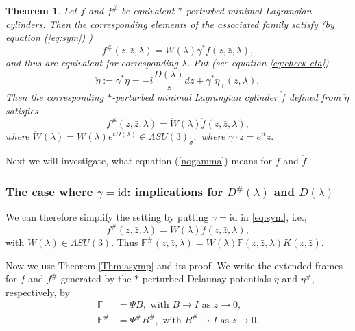 \documentclass[a4paper,11pt]{amsart}
\newtheorem{theorem}{Theorem}[section]
\theoremstyle{definition}
\numberwithin{equation}{section}
\begin{document}
\begin{theorem} \label{reduce to gamma = id}
Let $f$ and $f^{\#}$ be equivalent $*$-perturbed minimal Lagrangian cylinders. Then the corresponding elements
of the associated family satisfy  (by equation (\ref{eq:sym}) )
\begin{equation}
f^{\#}(z,\bar{z},\lambda)=W(\lambda) \gamma^*f( z, \bar{z}, \lambda),
\end{equation} 
and thus are equivalent for corresponding $\lambda$.
\newline Put  (see equation \eqref{eq:check-eta})
\begin{equation*}
\check{\eta}:=\gamma^*\eta=-i\frac{D(\lambda)}{z}dz+\gamma^*\eta_{+}(z,\lambda),
\end{equation*}
Then the corresponding  $*$-perturbed minimal Lagrangian cylinder $\check{f}$ defined from $\check{\eta}$
satisfies 
\begin{equation} \label{nogamma}
f^{\#}(z,\bar{z},\lambda)=\check{W}(\lambda)\check{f}(z,\bar{z},\lambda),
\end{equation}
where  $\check{W}(\lambda)=W(\lambda) e^{tD(\lambda)}\in \Lambda SU(3)_{\sigma},$ where $\gamma \cdot z = e^{it}z.$

\end{theorem}

Next we will investigate, what equation (\ref{nogamma}) means for $f$ and $\check{f}$.



\subsubsection{\textbf{The case where $\gamma=\mathrm{id}$: implications for $D^{\#}(\lambda)$ and $D(\lambda)$}}
We can therefore simplify the setting by putting $\gamma=\mathrm{id}$ in \eqref{eq:sym}, i.e.,
\begin{equation}\label{eq:sym1}
f^{\#}(z,\bar{z},\lambda)=W(\lambda)f(z,\bar{z},\lambda),
\end{equation}
with $W(\lambda)\in \Lambda SU(3)$. Thus 
$\mathbb{F}^{\#}(z,\bar{z},\lambda)=W(\lambda)\mathbb{F}(z,\bar{z},\lambda)K(z,\bar{z})$.



Now we use Theorem \ref{Thm:asymp} and its proof. We write the extended frames for $f$ and $f^{\#}$ generated by the $*$-perturbed Delaunay potentials $\eta$ and $\eta^{\#}$, respectively,  by
\begin{equation}
\begin{aligned}
\mathbb{F}&=\Psi B, \text{ with } B\rightarrow I \text{ as } z\rightarrow 0,\\
\mathbb{F}^{\#}&=\Psi^{\#} B^{\#}, \text{ with } B^{\#}\rightarrow I \text{ as } z\rightarrow 0.
\end{aligned}
\end{equation}
 
\end{document}

